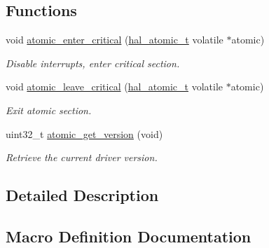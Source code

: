 \subsection*{Functions}
\begin{DoxyCompactItemize}
\item 
void \hyperlink{group__doc__driver__hal__helper__atomic_ga3bd20e6e0bdec53177758490510ba916}{atomic\+\_\+enter\+\_\+critical} (\hyperlink{group__doc__driver__hal__helper__atomic_ga6b3a0c9eea25111ac1877e0302e2fe1c}{hal\+\_\+atomic\+\_\+t} volatile $\ast$atomic)
\begin{DoxyCompactList}\small\item\em Disable interrupts, enter critical section. \end{DoxyCompactList}\item 
void \hyperlink{group__doc__driver__hal__helper__atomic_gaef0ccaa2438aca5ea074b36252d65990}{atomic\+\_\+leave\+\_\+critical} (\hyperlink{group__doc__driver__hal__helper__atomic_ga6b3a0c9eea25111ac1877e0302e2fe1c}{hal\+\_\+atomic\+\_\+t} volatile $\ast$atomic)
\begin{DoxyCompactList}\small\item\em Exit atomic section. \end{DoxyCompactList}\item 
uint32\+\_\+t \hyperlink{group__doc__driver__hal__helper__atomic_ga75fe13100e2799eb24a80123bc8c3787}{atomic\+\_\+get\+\_\+version} (void)
\begin{DoxyCompactList}\small\item\em Retrieve the current driver version. \end{DoxyCompactList}\end{DoxyCompactItemize}


\subsection{Detailed Description}


\subsection{Macro Definition Documentation}
\mbox{\label{group__doc__driver__hal__helper__atomic_ga039bfe712b6ba4388a35672f54763391}} 

